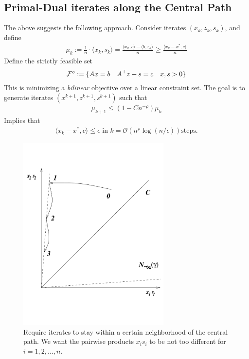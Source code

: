 \subsection{Primal-Dual iterates along the Central Path}
The above suggests the following approach. Consider iterates $(x_k,z_k,s_k)$, and define
\begin{eqnarray}
\mu_k := \frac{1}{n}\cdot \langle x_k, s_k \rangle = \frac{\langle x_k, c \rangle - \langle b,z_k \rangle}{n} \ge \frac{\langle x_k-x^* , c \rangle}{n}
\end{eqnarray}
Define the strictly feasible set
\begin{eqnarray}
{\cal F}^o := \{Ax = b \quad A^{\top} z + s = c \quad x,s  > 0\}
\end{eqnarray}
This is minimizing a \emph{bilinear} objective over a linear constraint set. The goal is to generate iterates $(x^{k+1},z^{k+1},s^{k+1})$ such that 
\begin{eqnarray}
\mu_{k+1} \le (1 - Cn^{-\rho})\mu_k
\end{eqnarray}
Implies that 
\begin{eqnarray}
\langle x_k - x^*, c \rangle \le \epsilon \text{ in } k = \mathcal{O}\left(n^{\rho}\log (n/\epsilon)\right) \text{steps}.
\end{eqnarray}

\begin{figure}[]
\begin{center}
\includegraphics[width=3in]{figures/lecture26-central_path}
\end{center}
\caption{Require iterates to stay within a certain neighborhood of the central path.
We want the pairwise products $x_i s_i$ to be not too different for $i = 1, 2, . . . , n.$ }
\label{fig:figcentralpath}
\end{figure}

